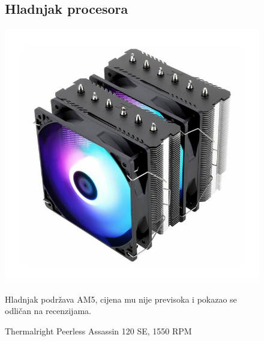 \documentclass{article}
\begin{document}
\begin{figure}[H]
\subsection{Hladnjak procesora}
\centering
\includegraphics[scale=0.2]{Slike/hl.jpg}
\caption{Thermalright Peerless Assassin 120 SE, 1550 RPM}
Hladnjak podržava AM5, cijena mu nije previsoka i pokazao se odličan na recenzijama.
\end{figure}
\end{document}
